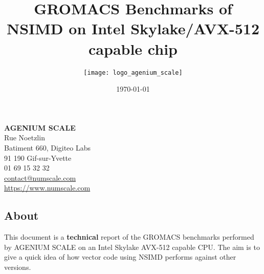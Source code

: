 \documentclass[a4paper,11pt]{article}
\date{\today}
\author{\texttt{[image: logo\_agenium\_scale]}}
\title{GROMACS Benchmarks of NSIMD on Intel Skylake/AVX-512 capable chip}
\newcommand{\gromacs}{GROMACS}
\newcommand{\nsimd}{NSIMD}
\newcommand{\cpu}{CPU}
\newcommand{\ageniumscale}{AGENIUM SCALE}
\begin{document}
\maketitle%
\vspace*{\fill}%
\noindent%
\textbf{\ageniumscale{}}\\
Rue Noetzlin\\
Batiment 660, Digiteo Labs\\
91 190 Gif-sur-Yvette\\
01 69 15 32 32\\
\href{mailto://contact@numscale.com}{contact@numscale.com}\\
\href{https://www.numscale.com}{https://www.numscale.com}\\
\thispagestyle{empty}
\clearpage
%
\thispagestyle{empty}
\tableofcontents
\newpage

\subsection*{About}%
\label{sec:about}

This document is a \textbf{technical} report of the \gromacs{} benchmarks performed by \ageniumscale{} on an Intel Skylake AVX-512 capable \cpu. The aim is to give a quick idea of how vector code using \nsimd{} performs against other versions.
\end{document}

